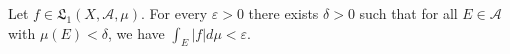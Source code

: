Let $f \in \mathfrak{L}_1(X, \mathcal{A}, \mu)$. For every $\varepsilon > 0$ there exists $\delta > 0$ such that for all $E \in \mathcal{A}$ with $\mu(E) < \delta$, we have $\int_E |f| d\mu < \varepsilon$.
